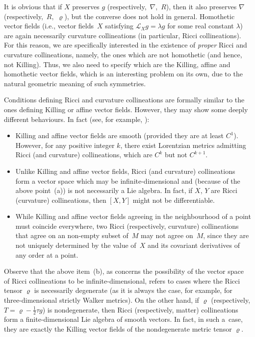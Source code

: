 \documentclass[10pt,a4paper]{amsart}
\numberwithin{equation}{section}
\begin{document}
It is obvious that if $X$ preserves $g$ (respectively,~$\nabla$,~$R$), then it also preserves $\nabla$ (respective\-ly,~$R$,~$\varrho$), but the converse does not hold in general. Homothetic vector f\/ields (i.e., vector f\/ields~$X$ satisfying $\mathcal L _X g=\lambda g$ for some real constant $\lambda$) are again necessarily curvature collineations (in particular, Ricci collineations). For this reason, we are specif\/ically interested in the existence of {\em proper} Ricci and curvature collineations, namely, the ones which are not homothetic (and hence, not Killing). Thus, we also need to specify which are the Killing, af\/f\/ine and homothetic vector f\/ields, which is an interesting problem on its own, due to the natural geometric meaning of such symmetries.

Conditions def\/ining Ricci and curvature collineations are formally similar to the ones def\/ining Killing or af\/f\/ine vector f\/ields. However, they may show some deeply dif\/ferent behaviours. In fact (see, for example, \cite{Hall,HRV}):
\begin{itemize}\itemsep=0pt
\item[(a)] Killing and af\/f\/ine vector f\/ields are smooth (provided they are at least $C^1$). However, for any positive integer $k$, there exist Lorentzian metrics admitting Ricci {(and curvature)} collineations, which are $C^k$ but not $C^{k+1}$.
\item[(b)] Unlike Killing and af\/f\/ine vector f\/ields, Ricci (and curvature) collineations form a vector space which may be inf\/inite-dimensional and (because of the above point~(a)) is not necessarily a Lie algebra. In fact, if $X$, $Y$ are Ricci (curvature) collineations, then $[X,Y]$ might not be dif\/ferentiable.
\item[(c)] While Killing and af\/f\/ine vector f\/ields agreeing in the neighbourhood of a point must coincide everywhere, two Ricci (respectively, curvature) collineations that agree on an non-empty subset of~$M$ may not agree on~$M$, since they are not uniquely determined by the value of~$X$ and its covariant derivatives of any order at a point.
\end{itemize}

Observe that the above item~(b), as concerns the possibility of the vector space of Ricci collineations to be inf\/inite-dimensional, refers to cases where the Ricci tensor $\varrho$ is necessarily degenerate (as it is always the case, for example, for three-dimensional strictly Walker metrics). On the other hand, if $\varrho$ (respectively, $T=\varrho-\frac{1}{2}\tau g$) is nondegenerate, then Ricci (respectively, matter) collineations form a f\/inite-dimensional Lie algebra of smooth vectors. In fact, in such a~case, they are exactly the Killing vector f\/ields of the nondegenerate metric tensor $\varrho$.
\end{document}
